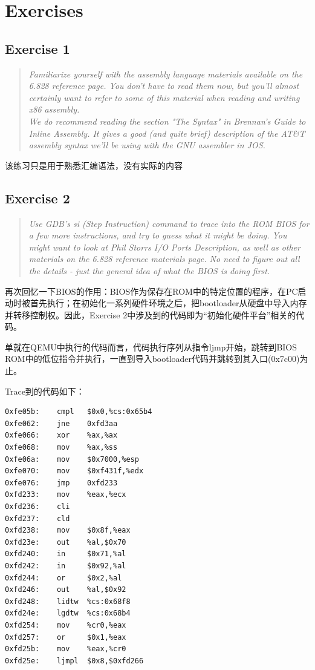 \section{Exercises}
\subsection{Exercise 1}
\begin{quote}
\textit{
Familiarize yourself with the assembly language materials available on the 6.828 reference page. You don't have to read them now, but you'll almost certainly want to refer to some of this material when reading and writing x86 assembly.\\
We do recommend reading the section "The Syntax" in Brennan's Guide to Inline Assembly. It gives a good (and quite brief) description of the AT\&T assembly syntax we'll be using with the GNU assembler in JOS.
}
\end{quote}

该练习只是用于熟悉汇编语法，没有实际的内容

\subsection{Exercise 2}
\begin{quote}
\textit{
Use GDB's si (Step Instruction) command to trace into the ROM BIOS for a few more instructions, and try to guess what it might be doing. You might want to look at Phil Storrs I/O Ports Description, as well as other materials on the 6.828 reference materials page. No need to figure out all the details - just the general idea of what the BIOS is doing first.
}
\end{quote}

再次回忆一下BIOS的作用：BIOS作为保存在ROM中的特定位置的程序，在PC启动时被首先执行；在初始化一系列硬件环境之后，把bootloader从硬盘中导入内存并转移控制权。因此，Exercise 2中涉及到的代码即为“初始化硬件平台”相关的代码。

单就在QEMU中执行的代码而言，代码执行序列从指令\textsf{ljmp}开始，跳转到BIOS ROM中的低位指令并执行，一直到导入bootloader代码并跳转到其入口(0x7c00)为止。

Trace到的代码如下：\\

\begin{lstlisting}[language={[x86masm]Assembler}]
0xfe05b:	cmpl   $0x0,%cs:0x65b4
0xfe062:	jne    0xfd3aa
0xfe066:	xor    %ax,%ax
0xfe068:	mov    %ax,%ss
0xfe06a:	mov    $0x7000,%esp
0xfe070:	mov    $0xf431f,%edx
0xfe076:	jmp    0xfd233
0xfd233:	mov    %eax,%ecx
0xfd236:	cli    
0xfd237:	cld    
0xfd238:	mov    $0x8f,%eax
0xfd23e:	out    %al,$0x70
0xfd240:	in     $0x71,%al
0xfd242:	in     $0x92,%al
0xfd244:	or     $0x2,%al
0xfd246:	out    %al,$0x92
0xfd248:	lidtw  %cs:0x68f8
0xfd24e:	lgdtw  %cs:0x68b4
0xfd254:	mov    %cr0,%eax
0xfd257:	or     $0x1,%eax
0xfd25b:	mov    %eax,%cr0
0xfd25e:	ljmpl  $0x8,$0xfd266
\end{lstlisting}

